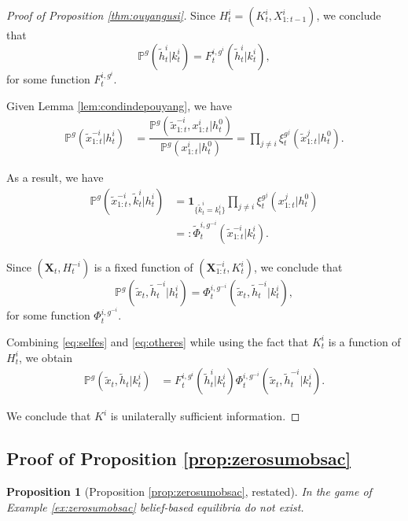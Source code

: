 \documentclass[pdflatex,sn-basic]{sn-jnl}
\renewcommand{\Pr}{\mathbb{P}}
\newcommand{\bX}{\mathbf{X}}
\newcommand{\Comp}{K}
\newcommand{\comp}{k}
\theoremstyle{thmstyleone}%
\newtheorem{prop}{Proposition}
\theoremstyle{thmstyletwo}%
\theoremstyle{thmstylethree}%
\begin{document}
\begin{appendices}
\begin{proof}[Proof of Proposition \ref{thm:ouyangusi}]
	Since $H_t^i=(\Comp_t^i, X_{1:t-1}^i)$, we conclude that
	\begin{equation}\label{eq:selfes}
		\Pr^{g}(\tilde{h}_t^i|\comp_t^i) = F_t^{i, g^i}(\tilde{h}_t^i|\comp_t^i),
	\end{equation}
	for some function $F_t^{i, g^i}$.
	
	Given Lemma \ref{lem:condindepouyang}, we have
	\begin{align}
		\Pr^{g}(\tilde{x}_{1:t}^{-i}|h_t^i) &= \dfrac{\Pr^g(\tilde{x}_{1:t}^{-i}, x_{1:t}^i|h_t^0)}{\Pr^g(x_{1:t}^i|h_t^0)}=\prod_{j\neq i} \xi_t^{g^j}(\tilde{x}_{1:t}^j|h_t^0).
	\end{align}
	
	As a result, we have
	\begin{align}
		\Pr^{g}(\tilde{x}_{1:t}^{-i}, \tilde{\comp}_t^i|h_t^i) &= \bm{1}_{\{\tilde{\comp}_t^i = \comp_t^i\} } \prod_{j\neq i} \xi_t^{g^j}(x_{1:t}^j|h_t^0)\\
		&=:\tilde{\Phi}_t^{i,g^{-i}}(\tilde{x}_{1:t}^{-i}|\comp_t^i).
	\end{align}
	
	Since $(\bX_t, H_t^{-i})$ is {a fixed function of} $(\bX_{1:t}^{-i}, \Comp_t^i)$, we conclude that
	\begin{equation}\label{eq:otheres}
		\Pr^{g}(\tilde{x}_t, \tilde{h}_{t}^{-i}|h_t^i) = \Phi_t^{i, g^{-i}}(\tilde{x}_t, \tilde{h}_{t}^{-i}|\comp_t^i),
	\end{equation}
	for some function $\Phi_t^{i, g^{-i}}$. 
	
	Combining \eqref{eq:selfes} and \eqref{eq:otheres} while using the fact that $\Comp_t^i$ is a function of $H_t^i$, we obtain
	\begin{align}
		\Pr^{g}(\tilde{x}_t, \tilde{h}_{t}|\comp_t^i) &= F_t^{i, g^i}(\tilde{h}_t^i|\comp_t^i)\Phi_t^{i, g^{-i}}(\tilde{x}_t, \tilde{h}_{t}^{-i}|\comp_t^i).
	\end{align}
	
	We conclude that $\Comp^i$ is unilaterally sufficient information.
\end{proof}

\subsection{Proof of Proposition \ref{prop:zerosumobsac}}\label{app:prop:zerosumobsac}
\begin{prop}[Proposition \ref{prop:zerosumobsac}, restated]
	In the game of Example \ref{ex:zerosumobsac} belief-based equilibria do not exist.
\end{prop}


\end{appendices}
\end{document}
